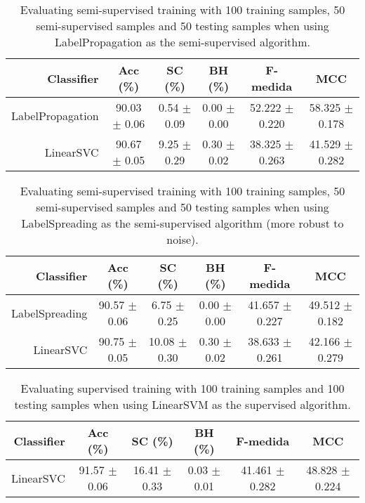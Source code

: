 \begin{table}[!htb]
\footnotesize
\centering
\caption{Evaluating semi-supervised training with 100 training samples, 50 semi-supervised samples and 50 testing samples when using LabelPropagation as the semi-supervised algorithm.}
\label{tab:label-propagation}
\begin{tabular}{r|c|c|c|c|c} \hline\hline
Classifier & Acc (\%) & SC (\%) & BH (\%) & F-medida & MCC \\ \hline
LabelPropagation & 90.03 $\pm$ 0.06 & 0.54 $\pm$ 0.09 & 0.00 $\pm$ 0.00 & 52.222 $\pm$ 0.220 & 58.325 $\pm$ 0.178 \\
LinearSVC & 90.67 $\pm$ 0.05 & 9.25 $\pm$ 0.29 & 0.30 $\pm$ 0.02 & 38.325 $\pm$ 0.263 & 41.529 $\pm$ 0.282 \\
\hline\hline
\end{tabular}
\end{table}
\begin{table}[!htb]
\footnotesize
\centering
\caption{Evaluating semi-supervised training with 100 training samples, 50 semi-supervised samples and 50 testing samples when using LabelSpreading as the semi-supervised algorithm (more robust to noise).}
\label{tab:label-spreading}
\begin{tabular}{r|c|c|c|c|c} \hline\hline
Classifier & Acc (\%) & SC (\%) & BH (\%) & F-medida & MCC \\ \hline
LabelSpreading & 90.57 $\pm$ 0.06 & 6.75 $\pm$ 0.25 & 0.00 $\pm$ 0.00 & 41.657 $\pm$ 0.227 & 49.512 $\pm$ 0.182 \\
LinearSVC & 90.75 $\pm$ 0.05 & 10.08 $\pm$ 0.30 & 0.30 $\pm$ 0.02 & 38.633 $\pm$ 0.261 & 42.166 $\pm$ 0.279 \\
\hline\hline
\end{tabular}
\end{table}
\begin{table}[!htb]
\footnotesize
\centering
\caption{Evaluating supervised training with 100 training samples and 100 testing samples when using LinearSVM as the supervised algorithm.}
\label{tab:linear-svm}
\begin{tabular}{r|c|c|c|c|c} \hline\hline
Classifier & Acc (\%) & SC (\%) & BH (\%) & F-medida & MCC \\ \hline
LinearSVC & 91.57 $\pm$ 0.06 & 16.41 $\pm$ 0.33 & 0.03 $\pm$ 0.01 & 41.461 $\pm$ 0.282 & 48.828 $\pm$ 0.224 \\
\hline\hline
\end{tabular}
\end{table}
